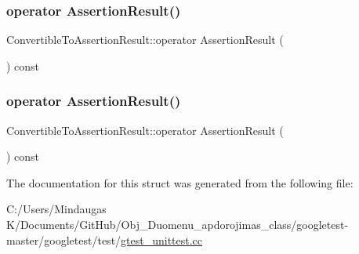 \subsubsection{\texorpdfstring{operator AssertionResult()}{operator AssertionResult()}\hspace{0.1cm}{\footnotesize\ttfamily [2/3]}}
{\footnotesize\ttfamily Convertible\+To\+Assertion\+Result\+::operator Assertion\+Result (\begin{DoxyParamCaption}{ }\end{DoxyParamCaption}) const\hspace{0.3cm}{\ttfamily [inline]}}

\mbox{\label{struct_convertible_to_assertion_result_a0f816f2f25ecaf29a95b3cfd4033e105}} 
\subsubsection{\texorpdfstring{operator AssertionResult()}{operator AssertionResult()}\hspace{0.1cm}{\footnotesize\ttfamily [3/3]}}
{\footnotesize\ttfamily Convertible\+To\+Assertion\+Result\+::operator Assertion\+Result (\begin{DoxyParamCaption}{ }\end{DoxyParamCaption}) const\hspace{0.3cm}{\ttfamily [inline]}}



The documentation for this struct was generated from the following file\+:\begin{DoxyCompactItemize}
\item 
C\+:/\+Users/\+Mindaugas K/\+Documents/\+Git\+Hub/\+Obj\+\_\+\+Duomenu\+\_\+apdorojimas\+\_\+class/googletest-\/master/googletest/test/\mbox{\hyperlink{googletest-master_2googletest_2test_2gtest__unittest_8cc}{gtest\+\_\+unittest.\+cc}}\end{DoxyCompactItemize}
